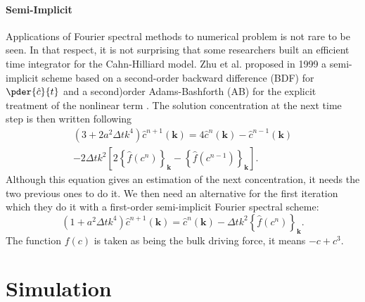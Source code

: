 \documentclass[10pt,a4paper,twocolumn]{article}
\begin{document}
\paragraph{Semi-Implicit}
Applications of Fourier spectral methods to numerical problem is not rare to be seen. In that respect, it is not surprising that some researchers built an efficient time integrator for the Cahn-Hilliard model. Zhu et al. proposed in 1999 a semi-implicit scheme based on a second-order backward  difference (BDF) for $\pder{\hat c}{t}$ and a second)order Adams-Bashforth (AB) for the explicit treatment of the nonlinear term \cite{zhu_1999}. The solution concentration at the next time step is then written following
\begin{multline}
	(3 + 2a^2 \Delta t k^4) \hat c^{n+1}(\mathbf k) = 4 \hat c^{n}(\mathbf k) - \hat c^{n-1}(\mathbf k) \\- 2 \Delta t k^2 \left[ 2 \left\{\hat f(c^n)\right\}_{\mathbf k} - \left\{\hat f(c^{n-1})\right\}_{\mathbf k} \right].
	\label{eq:dbf/ab}
\end{multline}
Although this equation gives an estimation of the next concentration, it needs the two previous ones to do it. We then need an alternative for the first iteration which they do it with a first-order semi-implicit Fourier spectral scheme:
\begin{equation}
	(1 + a^2 \Delta t k^4) \hat c^{n+1}(\mathbf k) = \hat c^{n}(\mathbf k) - \Delta t k^2 \left\{\hat f(c^n)\right\}_{\mathbf k}.
\end{equation}
The function $f(c)$ is taken as being the bulk driving force, it means $-c + c^3$.

\section{Simulation} %
\label{sec:simulation}
\end{document}
